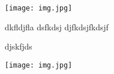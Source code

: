 \documentclass[10pt,landscape,a4paper]{article}
\begin{document}
\texttt{[image: img.jpg]}

\begin{multicols*}{5}
	dkfldjfla
	dsfkdsj
	djfkdsjfkdsjf

	djskfjds

\texttt{[image: img.jpg]}

\end{multicols*}
\end{document}
